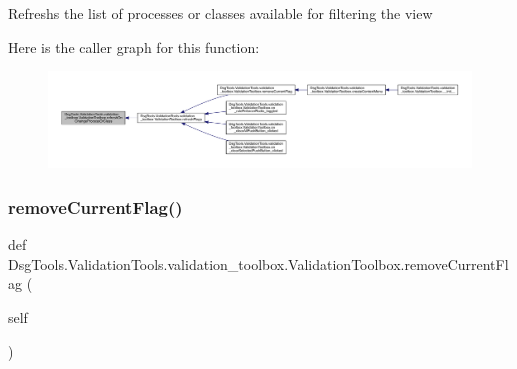 \begin{DoxyVerb}Refreshs the list of processes or classes available 
for filtering the view
\end{DoxyVerb}
 Here is the caller graph for this function\+:
\nopagebreak
\begin{figure}[H]
\begin{center}
\leavevmode
\includegraphics[width=350pt]{class_dsg_tools_1_1_validation_tools_1_1validation__toolbox_1_1_validation_toolbox_ae1a925049c04e40014efcac2cbb4ec8c_icgraph}
\end{center}
\end{figure}
\mbox{\label{class_dsg_tools_1_1_validation_tools_1_1validation__toolbox_1_1_validation_toolbox_acaabb546a967dba84db62cab485eec4d}} 
\subsubsection{\texorpdfstring{remove\+Current\+Flag()}{removeCurrentFlag()}}
{\footnotesize\ttfamily def Dsg\+Tools.\+Validation\+Tools.\+validation\+\_\+toolbox.\+Validation\+Toolbox.\+remove\+Current\+Flag (\begin{DoxyParamCaption}\item[{}]{self }\end{DoxyParamCaption})}

